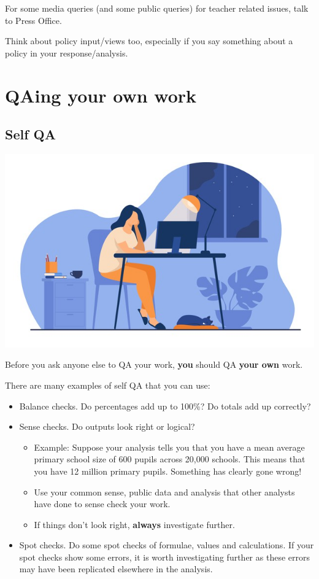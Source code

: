 \documentclass[
]{article}
\providecommand{\tightlist}{%
  \setlength{\itemsep}{0pt}\setlength{\parskip}{0pt}}
\begin{document}
For some media queries (and some public queries) for teacher related issues, talk to Press Office.

Think about policy input/views too, especially if you say something about a policy in your response/analysis.

\hypertarget{qaing-your-own-work}{%
\section{QAing your own work}\label{qaing-your-own-work}}

\hypertarget{self-qa}{%
\subsection{Self QA}\label{self-qa}}

\includegraphics{pictures/self_qa_pic.jpg}

Before you ask anyone else to QA your work, \textbf{you} should QA \textbf{your own} work.

There are many examples of self QA that you can use:

\begin{itemize}
\item
  Balance checks. Do percentages add up to 100\%? Do totals add up correctly?
\item
  Sense checks. Do outputs look right or logical?

  \begin{itemize}
  \tightlist
  \item
    Example: Suppose your analysis tells you that you have a mean average primary school size of 600 pupils across 20,000 schools. This means that you have 12 million primary pupils. Something has clearly gone wrong!
  \item
    Use your common sense, public data and analysis that other analysts have done to sense check your work.
  \item
    If things don't look right, \textbf{always} investigate further.
  \end{itemize}
\item
  Spot checks. Do some spot checks of formulae, values and calculations. If your spot checks show some errors, it is worth investigating further as these errors may have been replicated elsewhere in the analysis.
\end{itemize}
\end{document}

